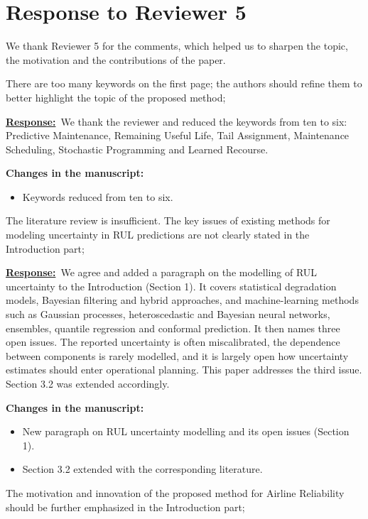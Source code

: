 \documentclass{article}
\newcommand{\response}{\vspace{0.1cm}\noindent\underline{\textbf{Response:}}\ }
\newcommand{\changes}{\vspace{0.1cm}\noindent\textbf{Changes in the manuscript:}}
\begin{document}
\newpage
\section{Response to Reviewer 5}

We thank Reviewer 5 for the comments, which helped us to sharpen the topic, the motivation and the contributions of the paper.

\begin{cmt}{}{}
There are too many keywords on the first page; the authors should refine them to better highlight the topic of the proposed method;
\end{cmt}

\response We thank the reviewer and reduced the keywords from ten to six: Predictive Maintenance, Remaining Useful Life, Tail Assignment, Maintenance Scheduling, Stochastic Programming and Learned Recourse.

\changes
\begin{itemize}[nosep]
\item Keywords reduced from ten to six.
\end{itemize}

\begin{cmt}{}{}
The literature review is insufficient. The key issues of existing methods for modeling uncertainty in RUL predictions are not clearly stated in the Introduction part;
\end{cmt}

\response We agree and added a paragraph on the modelling of RUL uncertainty to the Introduction (Section 1). It covers statistical degradation models, Bayesian filtering and hybrid approaches, and machine-learning methods such as Gaussian processes, heteroscedastic and Bayesian neural networks, ensembles, quantile regression and conformal prediction. It then names three open issues. The reported uncertainty is often miscalibrated, the dependence between components is rarely modelled, and it is largely open how uncertainty estimates should enter operational planning. This paper addresses the third issue. Section 3.2 was extended accordingly.

\changes
\begin{itemize}[nosep]
\item New paragraph on RUL uncertainty modelling and its open issues (Section 1).
\item Section 3.2 extended with the corresponding literature.
\end{itemize}

\begin{cmt}{}{}
The motivation and innovation of the proposed method for Airline Reliability should be further emphasized in the Introduction part;
\end{cmt}
\end{document}
